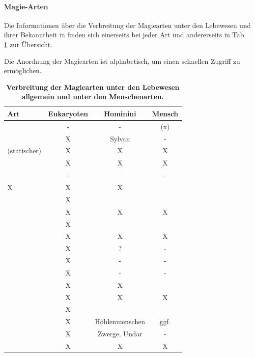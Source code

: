 \paragraph{Magie-Arten}
Die Informationen über die Verbreitung der Magiearten unter den Lebewesen und ihrer Bekanntheit in  finden sich einerseits bei jeder Art und andererseits in Tab. \ref{tab:magie-verbreitung} zur Übersicht.

Die Anordnung der Magiearten ist alphabetisch, um einen schnellen Zugriff zu ermöglichen.

\begin{table}[htb]
	\centering
	\caption{\textbf{Verbreitung der Magiearten unter den Lebewesen allgemein und unter den Menschenarten.}}
	\label{tab:magie-verbreitung}
	\begin{threeparttable}[\linewidth]
		\begin{tabularx}{\textwidth}{l|ccc}
			\toprule
			\textbf{Art} & \textbf{Eukaryoten} & \textbf{Hominini} & \textbf{Mensch} \\
		    \midrule
			\nameref{sec:nullmagie}  & - & - & (x)  \\
			\nameref{sec:bindungsmagie} & X & Sylvan & -  \\
			(statischer) \nameref{sec:druckmagie} & X & X & X  \\
			\nameref{sec:gleichstrommagie}  & X & X & X  \\
			\nameref{sec:gravitationsmagie} & - & - & - \\ \midrule[0.1px]
			\nameref{sec:hydrodynamikmagie} X & X & X &\\
			\nameref{sec:infrarotmagie} & X & & \\
			\nameref{sec:lichtmagie}  & X & X & X  \\
			\nameref{sec:mikrowellenmagie} & X & &\\
			\nameref{sec:proliferationsmagie} & X & X & X \\ \midrule[0.1px]
			\nameref{sec:quantenmechanikmagie} & X & ? & - \\
			\nameref{sec:roentgenmagie} & X & - & - \\
			\nameref{sec:rundfunkmagie} & X & - & - \\
			\nameref{sec:schubmagie} & X & X & \\
			\nameref{sec:temperaturmagie} & X & X & X  \\ \midrule[0.1px]
			\nameref{sec:terahertzmagie} & X & & \\
			\nameref{sec:uvmagie} & X & Höhlenmenschen & ggf. \\
			\nameref{sec:vibrationsmagie} & X & Zwerge, Undar & -  \\
			\nameref{sec:wechselstrommagie} & X & X & X \\
			\bottomrule
		\end{tabularx}
	\end{threeparttable}
\end{table}



